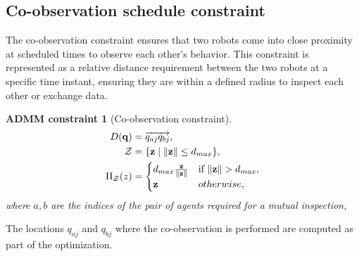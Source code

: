 \documentclass[10pt,twocolumn,twoside]{IEEEtran}
\newtheorem{constraint}{ADMM constraint}
\def\sZ{\mathcal{Z}}
\begin{document}

\subsection{Co-observation schedule constraint}\label{sec:co-observation-constraint}
The co-observation constraint ensures that two robots come into close proximity at scheduled times to observe each other's behavior. This constraint is represented as a relative distance requirement between the two robots at a specific time instant, ensuring they are within a defined radius to inspect each other or exchange data. %


\begin{constraint}[Co-observation constraint]\label{constraint:coobservation}
\begin{align}
D(\vq) &= \overrightarrow{q_{aj}q_{bj}}, \label{eq:coobservation_constraint}\\
  \sZ &= \{\vz \mid \norm{\vz} \leq d_{max} \},\\
   \Pi_\sZ(z) & = \begin{cases}
d_{max}\frac{\vz}{\norm{\vz}} &\text{if } \norm{\vz} > d_{max},\\
\vz	& otherwise,
\end{cases}
\end{align}
where $a,b$ are the indices of the pair of agents required for a mutual inspection, 
\end{constraint}
The locations $q_{aj}$ and $q_{bj}$ where the co-observation is performed are computed as part of the optimization.
\end{document}

